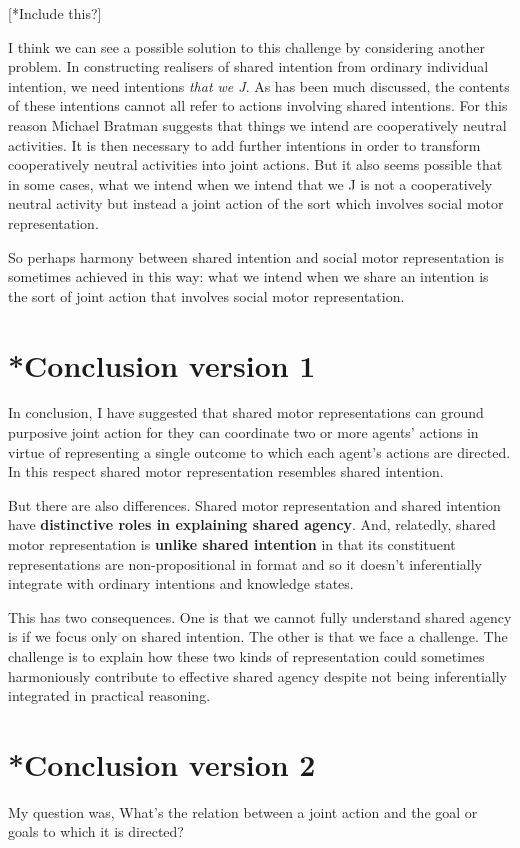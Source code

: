 \documentclass[12pt,\papersize]{extarticle}
\begin{document}
[*Include this?]

I think we can see a possible solution to this challenge by considering another problem.
In constructing realisers of shared intention from ordinary individual intention, we need intentions \emph{that we J}.
As has been much discussed, the contents of these intentions cannot all refer to actions involving shared intentions.
For this reason Michael Bratman suggests that things we intend are  cooperatively neutral activities.
It is then necessary to add further intentions in order to transform cooperatively neutral activities into joint actions.
But it also seems possible that in some cases, what we intend when we intend that we J is not a cooperatively neutral activity but instead a joint action of the sort which involves social motor representation.

So perhaps harmony between shared intention and social motor representation is sometimes achieved in this way: what we intend when we share an intention is the sort of joint action that involves social motor representation.


\section{*Conclusion version 1}
In conclusion,
I have suggested that 
shared motor representations
can 
ground purposive joint action
for they
can coordinate two or more agents' actions in virtue of representing a single outcome to which each agent's actions are directed.
In this respect shared motor representation resembles shared intention.

But there are also differences.
Shared motor representation
and
shared intention  
have \textbf{distinctive roles in explaining shared agency}.
And, relatedly, shared motor representation is \textbf{unlike shared intention} in that its constituent representations are non-propositional in format and so it doesn't inferentially integrate with ordinary intentions and knowledge states.

This has two consequences.
One is that we cannot fully understand shared agency is if we focus only on shared intention.
The other is that we face a challenge.
The challenge is to explain how these two kinds of representation could sometimes harmoniously contribute to effective shared agency despite not being inferentially integrated in practical reasoning.



\section{*Conclusion version 2}
My question was,
What's the relation between a joint action and the goal or goals to which it is directed?
\end{document}
